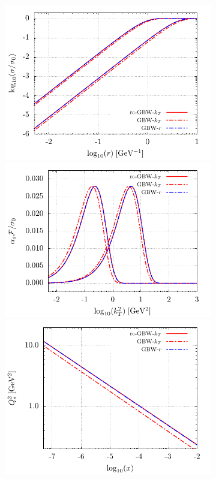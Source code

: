 \documentclass[11pt]{article}
\begin{document}
\begin{figure}[p]

  \begin{multicols}{2}
  \begin{subfigure}{0.5\textwidth}
    \includegraphics[width=\textwidth]{./plots/GBW-dipole.pdf}
    \includegraphics[width=\textwidth]{./plots/GBW-gluon.pdf}
    \includegraphics[width=\textwidth]{./plots/GBW-saturation.pdf}

\end{subfigure}
\end{multicols}
\end{figure}
\end{document}
